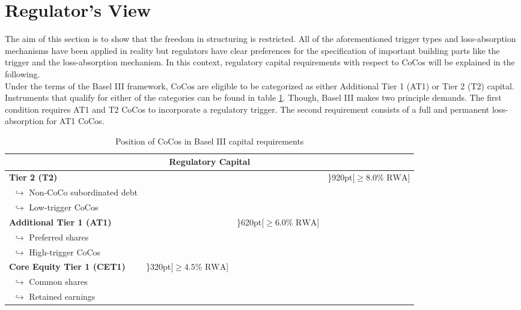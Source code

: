 \section{Regulator's View}
The aim of this section is to show that the freedom in structuring is restricted. All of the aforementioned trigger types and loss-absorption mechanisms have been applied in reality but regulators have clear preferences for the specification of important building parts like the trigger and the loss-absorption mechanism. In this context, regulatory capital requirements with respect to CoCos will be explained in the following.\\

Under the terms of the Basel III framework, CoCos are eligible to be categorized as either Additional Tier 1 (AT1) or Tier 2 (T2) capital. Instruments that qualify for either of the categories can be found in table \ref{tbl:baselII}. Though, Basel III makes two principle demands. The first condition requires AT1 and T2 CoCos to incorporate a regulatory trigger. The second requirement consists of a full and permanent loss-absorption for AT1 CoCos. \citep{avdjiev2013cocos}

\begin{table}[H]
	\setlength{\extrarowheight}{2.5pt}
	\centering
	\begin{tabular}{p{6.1cm}p{2.3cm}p{2.3cm}p{2.7cm}}
	\toprule
	 \multicolumn{4}{c}{\textbf{Regulatory Capital}} \\
	\midrule
	\textbf{Tier 2 (T2)} & & &  \rdelim\}{9}{20pt}[$\geq 8.0\% \text{ RWA}$]  \\ %
	$\,\,\,$$\hookrightarrow$ Non-CoCo subordinated debt & & & \\
	\cellcolor{blue!20} $\,\,\,$$\hookrightarrow$ Low-trigger CoCos & & & \\
	\textbf{Additional Tier 1 (AT1)} & &  \rdelim\}{6}{20pt}[$\geq 6.0\% \text{ RWA}$]  & \\
	$\,\,\,$$\hookrightarrow$ Preferred shares & & & \\
	\cellcolor{blue!20} $\,\,\,$$\hookrightarrow$ High-trigger CoCos & & & \\
	\textbf{Core Equity Tier 1 (CET1)} & \rdelim\}{3}{20pt}[$\geq 4.5\% \text{ RWA}$] & & \\
	$\,\,\,$$\hookrightarrow$ Common shares & & & \\
	$\,\,\,$$\hookrightarrow$ Retained earnings & & & \\
	\bottomrule
	\end{tabular}
	\caption[Position of CoCos in Basel III capital requirements]{Position of CoCos in Basel III capital requirements \citep{avdjiev2013cocos}}
	\label{tbl:baselII}
\end{table}

